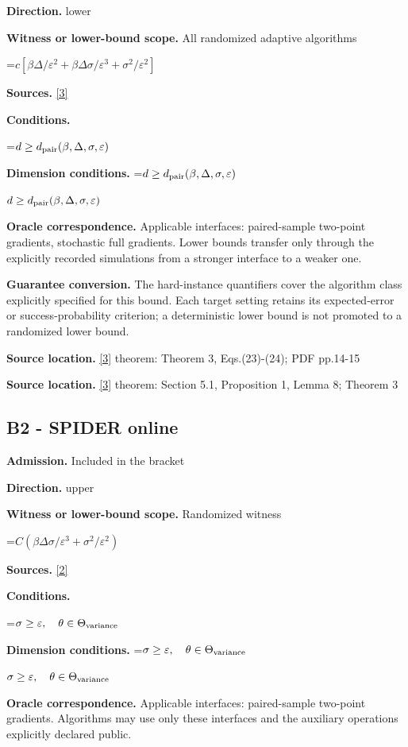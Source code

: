 \documentclass[10pt,a4paper]{article}
\newcommand{\AtlasMath}[1]{\par\begingroup\centering\setbox0=\hbox{$\displaystyle #1$}\ifdim\wd0>1.4\linewidth\typeout{ATLAS WIDE FORMULA: \the\wd0}\fi\ifdim\wd0>\linewidth\resizebox{\linewidth}{!}{\box0}\else\box0\fi\par\endgroup}
\newcommand{\AtlasInlineMath}[1]{\begingroup\setbox0=\hbox{$#1$}\ifdim\wd0>.4\linewidth\endgroup\AtlasMath{#1}\else\endgroup$#1$\fi}
\begin{document}
\textbf{Direction.} lower

\textbf{Witness or lower-bound scope.} All randomized adaptive algorithms

\AtlasMath{c[\beta\Delta/\varepsilon^2+\beta\Delta\sigma/\varepsilon^3+\sigma^2/\varepsilon^2]}
\textbf{Sources.} \href{https://arxiv.org/pdf/1912.02365}{[3]}

\textbf{Conditions.} 
\AtlasMath{d\ge d_{\rm pair}(\beta,\Delta,\sigma,\varepsilon)}


\textbf{Dimension conditions.} \AtlasInlineMath{d\ge d_{\rm pair}(\beta,\Delta,\sigma,\varepsilon)}

\textbf{Oracle correspondence.} Applicable interfaces: paired-sample two-point gradients, stochastic full gradients. Lower bounds transfer only through the explicitly recorded simulations from a stronger interface to a weaker one.

\textbf{Guarantee conversion.} The hard-instance quantifiers cover the algorithm class explicitly specified for this bound. Each target setting retains its expected-error or success-probability criterion; a deterministic lower bound is not promoted to a randomized lower bound.

\textbf{Source location.} \href{https://arxiv.org/pdf/1912.02365}{[3]} theorem: Theorem 3, Eqs.(23)-(24); PDF pp.14-15

\textbf{Source location.} \href{https://arxiv.org/pdf/1912.02365}{[3]} theorem: Section 5.1, Proposition 1, Lemma 8; Theorem 3

\subsection{B2 - SPIDER online}
\textbf{Admission.} Included in the bracket

\textbf{Direction.} upper

\textbf{Witness or lower-bound scope.} Randomized witness

\AtlasMath{C(\beta\Delta\sigma/\varepsilon^3+\sigma^2/\varepsilon^2)}
\textbf{Sources.} \href{https://arxiv.org/pdf/1807.01695}{[2]}

\textbf{Conditions.} 
\AtlasMath{\sigma\ge\varepsilon,\quad\theta\in\Theta_{\rm variance}}


\textbf{Dimension conditions.} \AtlasInlineMath{\sigma\ge\varepsilon,\quad\theta\in\Theta_{\rm variance}}

\textbf{Oracle correspondence.} Applicable interfaces: paired-sample two-point gradients. Algorithms may use only these interfaces and the auxiliary operations explicitly declared public.
\end{document}

